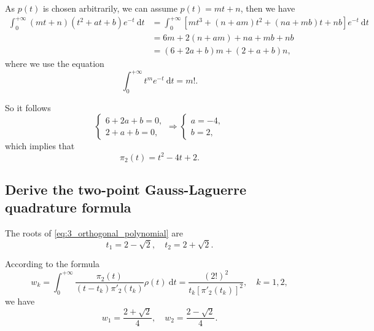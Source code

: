\documentclass[a4paper]{article}
\begin{document}
As $p(t)$ is chosen arbitrarily, we can assume $p(t) = mt + n$, then we have
\begin{equation}
    \begin{aligned}
        \int_0^{+\infty} (mt + n)(t^2 + at + b) e^{-t}\ \mathrm{d}t &= \int_0^{+\infty} [mt^3 + (n + am)t^2 + (na + mb)t + nb]e^{-t} \ \mathrm{d}t \\
        &= 6m + 2(n + am) + na + mb + nb \\
        &= (6 + 2a + b)m + (2 + a + b)n,
    \end{aligned}
    \label{eq:3_orthogonal_int} 
\end{equation}
where we use the equation
\begin{equation}
    \int_0^{+\infty} t^m e^{-t}\ \mathrm{d}t = m!.
    \label{eq:3_orthogonal_int_m}
\end{equation}

So it follows 
\begin{equation}
    \begin{cases}
    6 + 2a + b = 0, \\
    2 + a + b = 0,
    \end{cases}
    \Rightarrow 
    \begin{cases}
        a = -4, \\
        b = 2,
    \end{cases}
    \label{eq:3_orthogonal_solution}
\end{equation}
which implies that 
\begin{equation}
    \pi_2(t) = t^2 - 4t + 2.
    \label{eq:3_orthogonal_polynomial}
\end{equation}

\subsection{Derive the two-point Gauss-Laguerre quadrature formula}

The roots of \cref{eq:3_orthogonal_polynomial} are 
\begin{equation}
    t_1 = 2 - \sqrt{2}, \quad t_2 = 2 + \sqrt{2}.
    \label{eq:3_roots}
\end{equation}

According to the formula 
\begin{equation}
    w_k = \int_0^{+\infty} \frac{\pi_2(t)}{(t - t_k)\pi'_2(t_k)}\rho(t)\ \mathrm{d}t = \frac{(2!)^2}{t_k[\pi'_2(t_k)]^2}, \quad k = 1,2,
    \label{eq:3_integral_formula}
\end{equation}
we have 
\begin{equation}
    w_1 = \frac{2 + \sqrt{2}}{4}, \quad w_2 = \frac{2 - \sqrt{2}}{4}.
    \label{eq:3_integral_formula_values}
\end{equation}
\end{document}
